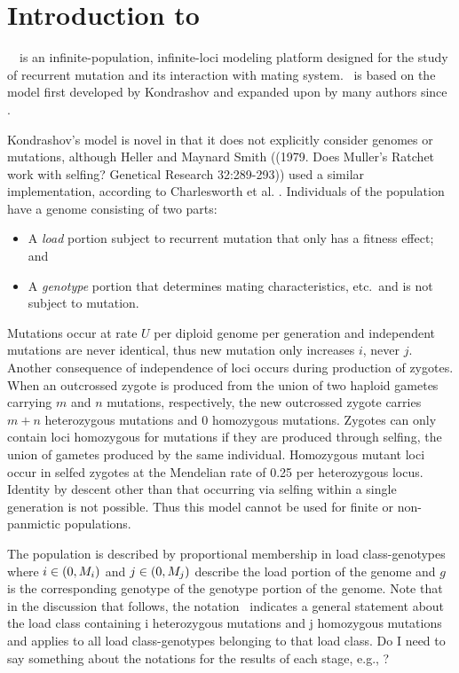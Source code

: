 % 

\chapter{Introduction to \K}

\REDO\  \K\ is an infinite-population, infinite-loci modeling platform designed for the study of recurrent mutation and its interaction with mating system.  \K\ is based on the model first developed by Kondrashov \cite{Kondrashov:1985:5375} and expanded upon by many authors since \cite{Charlesworth:1991:5336}.

Kondrashov's \cite{Kondrashov:1985:5375} model is novel in that it does not explicitly consider genomes or mutations, although Heller and Maynard Smith ((1979. Does Muller's Ratchet work with selfing? Genetical Research 32:289-293)) used a similar implementation, according to Charlesworth et al. \cite{Charlesworth:1991:5336}.  Individuals of the population have a genome consisting of two parts:
\begin{itemize}
	\item A {\em load} portion subject to recurrent mutation that only has a fitness effect; and
	\item A {\em genotype} portion that determines mating characteristics, etc.\ and is not subject to mutation.
\end{itemize}
Mutations occur at rate $U$ per diploid genome per generation and independent mutations are never identical, thus new mutation only increases $i$, never $j$.  Another consequence of independence of loci occurs during production of zygotes.  When an outcrossed zygote is produced from the union of two haploid gametes carrying $m$ and $n$ mutations, respectively, the new outcrossed zygote carries $m+n$ heterozygous mutations and $0$ homozygous mutations.  Zygotes can only contain loci homozygous for mutations if they are produced through selfing, the union of gametes produced by the same individual.  Homozygous mutant loci occur in selfed zygotes at the Mendelian rate of 0.25 per heterozygous locus.  Identity by descent other than that occurring via selfing within a single generation is not possible.  Thus this model cannot be used for finite or non-panmictic populations.

The population is described by proportional membership in load class-genotypes \Lijg\, where $i\in(0,\mbox{$M_{i}$})$ and $j\in(0,\mbox{$M_{j}$})$ describe the load portion of the genome and $g$ is the corresponding genotype of the genotype portion of the genome.  Note that in the discussion that follows, the notation \Lij\ indicates a general statement about the load class containing i heterozygous mutations and j homozygous mutations and applies to all load class-genotypes belonging to that load class.  Do I need to say something about the notations for the results of each stage, e.g., \xpijg?

